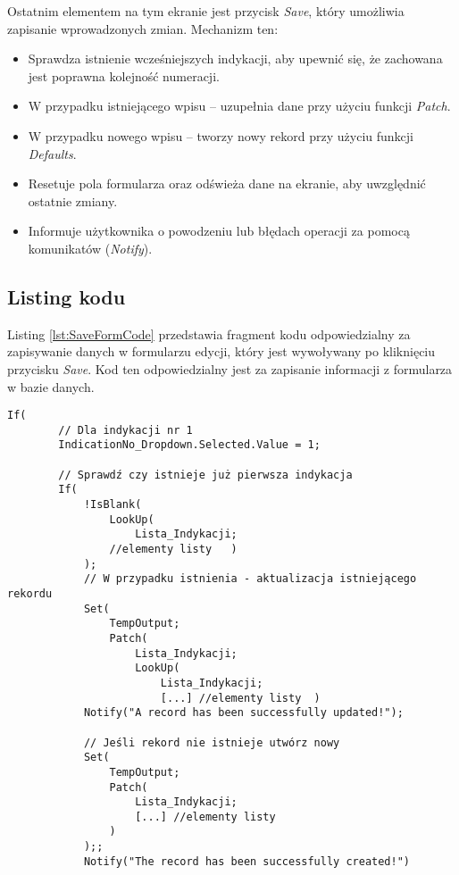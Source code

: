 Ostatnim elementem na tym ekranie jest przycisk \emph{Save}, który umożliwia zapisanie wprowadzonych zmian. Mechanizm ten:

\begin{itemize}
    \item Sprawdza istnienie wcześniejszych indykacji, aby upewnić się, że zachowana jest poprawna kolejność numeracji.
    \item W przypadku istniejącego wpisu -- uzupełnia dane przy użyciu funkcji \emph{Patch}.
    \item W przypadku nowego wpisu -- tworzy nowy rekord przy użyciu funkcji \emph{Defaults}.
    \item Resetuje pola formularza oraz odświeża dane na ekranie, aby uwzględnić ostatnie zmiany.
    \item Informuje użytkownika o powodzeniu lub błędach operacji za pomocą komunikatów (\emph{Notify}).
\end{itemize}

\subsection{Listing kodu}

Listing \ref{lst:SaveFormCode} przedstawia fragment kodu odpowiedzialny za zapisywanie danych w formularzu edycji, który jest wywoływany po kliknięciu przycisku \emph{Save}. Kod ten odpowiedzialny jest za zapisanie informacji z formularza w bazie danych.

\begin{lstlisting}[language=PowerFx, caption={Kod zapisywania danych w formularzu edycji}, label=lst:SaveFormCode]
    If(
        // Dla indykacji nr 1
        IndicationNo_Dropdown.Selected.Value = 1;
        
        // Sprawdź czy istnieje już pierwsza indykacja
        If(
            !IsBlank(
                LookUp(
                    Lista_Indykacji;
                //elementy listy   )
            );
            // W przypadku istnienia - aktualizacja istniejącego rekordu
            Set(
                TempOutput;
                Patch(
                    Lista_Indykacji;
                    LookUp(
                        Lista_Indykacji;
                        [...] //elementy listy  )
            Notify("A record has been successfully updated!");
            
            // Jeśli rekord nie istnieje utwórz nowy
            Set(
                TempOutput;
                Patch(
                    Lista_Indykacji;
                    [...] //elementy listy
                )
            );;
            Notify("The record has been successfully created!")
\end{lstlisting}